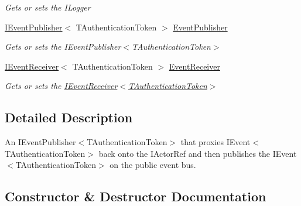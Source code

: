 \begin{DoxyCompactItemize}
\begin{DoxyCompactList}\small\item\em Gets or sets the I\+Logger \end{DoxyCompactList}\item 
\hyperlink{interfaceCqrs_1_1Events_1_1IEventPublisher}{I\+Event\+Publisher}$<$ T\+Authentication\+Token $>$ \hyperlink{classCqrs_1_1Akka_1_1Events_1_1AkkaEventBus_a763ef1bf4f3d48ad066a38e576e2d7f0_a763ef1bf4f3d48ad066a38e576e2d7f0}{Event\+Publisher}
\begin{DoxyCompactList}\small\item\em Gets or sets the I\+Event\+Publisher$<$\+T\+Authentication\+Token$>$ \end{DoxyCompactList}\item 
\hyperlink{interfaceCqrs_1_1Events_1_1IEventReceiver}{I\+Event\+Receiver}$<$ T\+Authentication\+Token $>$ \hyperlink{classCqrs_1_1Akka_1_1Events_1_1AkkaEventBus_a8e2deeb33b6c6cbc59bec0e0786d5b71_a8e2deeb33b6c6cbc59bec0e0786d5b71}{Event\+Receiver}
\begin{DoxyCompactList}\small\item\em Gets or sets the \hyperlink{interfaceCqrs_1_1Events_1_1IEventReceiver}{I\+Event\+Receiver$<$\+T\+Authentication\+Token$>$} \end{DoxyCompactList}\end{DoxyCompactItemize}


\subsection{Detailed Description}
An I\+Event\+Publisher$<$\+T\+Authentication\+Token$>$ that proxies I\+Event$<$\+T\+Authentication\+Token$>$ back onto the I\+Actor\+Ref and then publishes the I\+Event$<$\+T\+Authentication\+Token$>$ on the public event bus. 



\subsection{Constructor \& Destructor Documentation}
\mbox{\label{classCqrs_1_1Akka_1_1Events_1_1AkkaEventBus_ab1f292c21b5516a89fdcc019deb04063_ab1f292c21b5516a89fdcc019deb04063}} 
